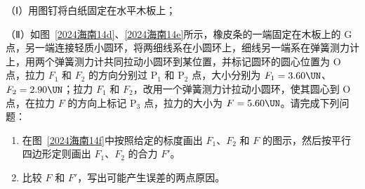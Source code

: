 \documentclass[\gkver]{gaokaozhenti}
\begin{document}
\begin{enumerate}
（Ⅰ）用图钉将白纸固定在水平木板上；

（Ⅱ）如图~\ref{2024海南14d}、\ref{2024海南14e}所示，橡皮条的一端固定在木板上的 G 点，另一端连接轻质小圆环，将两细线系在小圆环上，细线另一端系在弹簧测力计上，用两个弹簧测力计共同拉动小圆环到某位置，并标记圆环的圆心位置为 O 点，拉力 $F_{1}$ 和 $F_{2}$ 的方向分别过 P$_{1}$ 和 P$_{2}$ 点，大小分别为 $F_{1} = 3.60 \UN$、$F_{2} = 2.90 \UN$；拉力 $F_{1}$ 和 $F_{2}$，改用一个弹簧测力计拉动小圆环，使其圆心到 O 点，在拉力 $F$ 的方向上标记 P$_{3}$ 点，拉力的大小为 $F = 5.60 \UN$。请完成下列问题：
\begin{enumerate}[label=\protect\Circled{\arabic*}]
	\item
	在图~\ref{2024海南14f}中按照给定的标度画出 $F_{1}$、$F_{2}$ 和 $F$ 的图示，然后按平行四边形定则画出 $F_{1}$、$F_{2}$ 的合力 $F'$。
	\item
	比较 $F$ 和 $F'$，写出可能产生误差的两点原因\tkanswer[3.0cm]{}。
\end{enumerate}


\end{enumerate}
\end{document}
